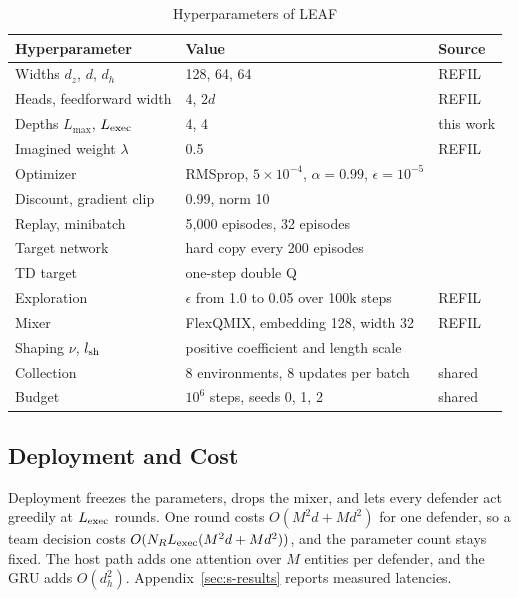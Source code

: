 \begin{table}[!t]
\centering
\scriptsize
\setlength{\tabcolsep}{3pt}
\caption{Hyperparameters of LEAF}
\label{tab:s-hyper}
\begin{tabular}{@{}l p{} l@{}}
\toprule
Hyperparameter & Value & Source\\
\midrule
Widths $d_z$, $d$, $d_h$ & 128, 64, 64 & REFIL\\
Heads, feedforward width & 4, $2d$ & REFIL\\
Depths $L_{\max}$, $L_{\rm exec}$ & 4, 4 & this work\\
Imagined weight $\lambda$ & 0.5 & REFIL~\cite{iqbal2021refil}\\
Optimizer & RMSprop, $5\times10^{-4}$, $\alpha=0.99$, $\epsilon=10^{-5}$ & \cite{samvelyan2019smac}\\
Discount, gradient clip & 0.99, norm 10 & \cite{samvelyan2019smac}\\
Replay, minibatch & 5,000 episodes, 32 episodes & \cite{samvelyan2019smac}\\
Target network & hard copy every 200 episodes & \cite{mnih2015dqn}\\
TD target & one-step double Q & \cite{vanhasselt2016double}\\
Exploration & $\epsilon$ from 1.0 to 0.05 over 100k steps & REFIL\\
Mixer & FlexQMIX, embedding 128, width 32 & REFIL\\
Shaping $\nu$, $l_{\rm sh}$ & positive coefficient and length scale & \cite{ng1999shaping}\\
Collection & 8 environments, 8 updates per batch & shared\\
Budget & $10^6$ steps, seeds 0, 1, 2 & shared\\
\bottomrule
\end{tabular}
\end{table}

\subsection{Deployment and Cost}
Deployment freezes the parameters, drops the mixer, and lets every defender act greedily at $L_{\rm exec}$ rounds. One round costs $O(M^2d+Md^2)$ for one defender, so a team decision costs $O(N_RL_{\rm exec}(M^2d+Md^2))$, and the parameter count stays fixed. The host path adds one attention over $M$ entities per defender, and the GRU adds $O(d_h^2)$. Appendix~\ref{sec:s-results} reports measured latencies.

